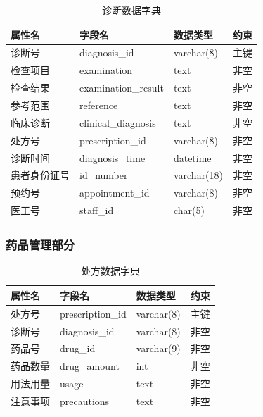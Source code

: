 \documentclass{article}
\begin{document}
\begin{table}[H]
    \centering
    \begin{tabularx}{\textwidth}{|p{2.2cm}|p{3.2cm}|p{4.8cm}|p{5cm}|}
    \toprule
    \textbf{属性名} & \textbf{字段名} & \textbf{数据类型} & \textbf{约束} \\ \midrule
    诊断号 & diagnosis\_id & varchar(8) & 主键 \\ \midrule
    检查项目 & examination & text & 非空 \\ \midrule
    检查结果 & examination\_result & text & 非空 \\ \midrule
    参考范围 & reference & text & 非空 \\ \midrule
    临床诊断 & clinical\_diagnosis & text & 非空 \\ \midrule
    处方号 & prescription\_id & varchar(8) & 非空 \\ \midrule
    诊断时间 & diagnosis\_time & datetime & 非空 \\ \midrule
    患者身份证号 & id\_number & varchar(18) & 非空 \\ \midrule
    预约号 & appointment\_id & varchar(8) & 非空 \\ \midrule
    医工号 & staff\_id & char(5) & 非空 \\ \bottomrule
    \end{tabularx}
    \caption{诊断数据字典}
    \label{tab:diagnosis}
\end{table}

\subsubsection{药品管理部分}

\begin{table}[H]
    \centering
    \begin{tabularx}{\textwidth}{|p{2.2cm}|p{3.2cm}|p{4.8cm}|p{5cm}|}
    \toprule
    \textbf{属性名} & \textbf{字段名} & \textbf{数据类型} & \textbf{约束} \\ \midrule
    处方号 & prescription\_id & varchar(8) & 主键 \\ \midrule
    诊断号 & diagnosis\_id & varchar(8) & 非空\\ \midrule
    药品号 & drug\_id & varchar(9) & 非空 \\ \midrule
    药品数量 & drug\_amount & int & 非空 \\ \midrule
    用法用量 & usage & text & 非空 \\ \midrule
    注意事项 & precautions & text & 非空 \\ \bottomrule
    \end{tabularx}
    \caption{处方数据字典}
    \label{tab:prescription}
\end{table}
\end{document}
